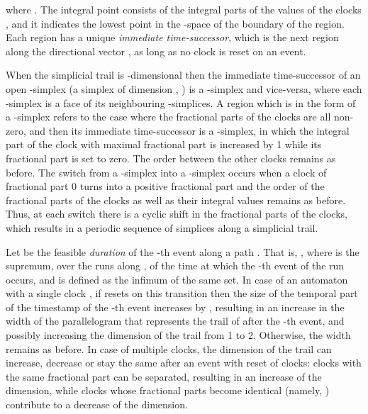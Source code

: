 \documentclass[11pt]{amsart}
\theoremstyle{definition}
\begin{document}
 where .
The integral point  consists of the integral parts of the values of the clocks , and it indicates the lowest point in 
the -space of the boundary of the region.  
Each region has a unique \emph{immediate time-successor}, which is the next region along the directional vector , as long as no clock is reset on an event.

When the simplicial trail  is -dimensional then the immediate time-successor of an open -simplex (a simplex of dimension , ) is a -simplex and vice-versa, where each -simplex is a face of its neighbouring -simplices.
A region which is in the form of a -simplex refers to the case where the fractional parts of the clocks are all non-zero, and then its immediate time-successor is a -simplex, in which the integral part of the clock with maximal fractional part is increased by 1 while its fractional part is set to zero. The order between the other clocks remains as before.
The switch from a -simplex into a -simplex occurs when a clock of fractional part 0 turns into a positive fractional part and the order of the fractional parts of the clocks as well as their integral values remains as before.  
Thus, at each switch there is a cyclic shift in the fractional parts of the clocks, which results in a periodic sequence of simplices along a simplicial trail.

Let  be the feasible \emph{duration} of the -th event along a path .
That is, , where  is the supremum, over the runs along , of the time at which the -th event of the run occurs, and  is defined as the infimum of the same set.
In case of an automaton with a single clock , if  resets on this transition then the size of the temporal part of the timestamp of the -th event increases by , resulting in an increase in the width of the parallelogram that represents the trail of  after the -th event, and possibly increasing the dimension of the trail from 1 to 2.
Otherwise, the width remains as before.
In case of multiple clocks, the dimension of the trail can increase, decrease or stay the same after an event with reset of clocks: clocks with the same fractional part can be separated, resulting in an increase of the dimension, while clocks whose fractional parts become identical (namely, ) contribute to a decrease of the dimension.
\end{document}
